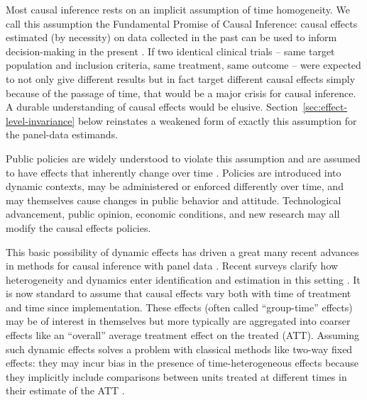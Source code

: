 \documentclass{article}
\begin{document}
Most causal inference rests on an implicit assumption of time homogeneity. We call this assumption the Fundamental Promise of Causal Inference: causal effects estimated (by necessity) on data collected in the past can be used to inform decision-making in the present \citep{egamiElementsExternalValidity2023,khosrowiExtrapolationCausalEffects2019,cartwrightHuntingCausesUsing2007}. If two identical clinical trials -- same target population and inclusion criteria, same treatment, same outcome -- were expected to not only give different results but in fact target different causal effects simply because of the passage of time, that would be a major crisis for causal inference. A durable understanding of causal effects would be elusive. Section~\ref{sec:effect-level-invariance} below reinstates a weakened form of exactly this assumption for the panel-data estimands.

Public policies are widely understood to violate this assumption and are assumed to have effects that inherently change over time \citep{lucasjrEconometricPolicyEvaluation1976,ericssonExogeneityCointegrationEconomic1998,estrellaAreDeepParameters1999}. Policies are introduced into dynamic contexts, may be administered or enforced differently over time, and may themselves cause changes in public behavior and attitude. Technological advancement, public opinion, economic conditions, and new research may all modify the causal effects policies.

This basic possibility of dynamic effects has driven a great many recent advances in methods for causal inference with panel data \citep{sunEstimatingDynamicTreatment2021,wangAdvancesDifferenceindifferencesMethods2024a}. Recent surveys clarify how heterogeneity and dynamics enter identification and estimation in this setting \citep{arkhangelskyCausalModelsLongitudinal2024,dechaisemartinTwowayFixedEffects2023}. It is now standard to assume that causal effects vary both with time of treatment and time since implementation. These effects (often called ``group-time'' effects) may be of interest in themselves but more typically are aggregated into coarser effects like an ``overall'' average treatment effect on the treated (ATT). Assuming such dynamic effects solves a problem with classical methods like two-way fixed effects: they may incur bias in the presence of time-heterogeneous effects because they implicitly include comparisons between units treated at different times in their estimate of the ATT \citep{sunEstimatingDynamicTreatment2021}.
\end{document}
